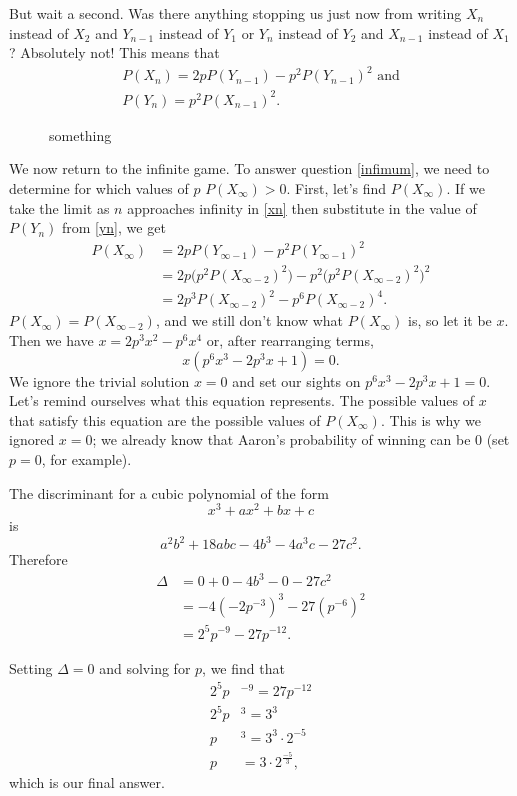 \documentclass{book}
\begin{document}
But wait a second. Was there anything stopping us just now from writing $X_n$ instead of $X_2$ and $Y_{n-1}$ instead of $Y_1$ or $Y_n$ instead of $Y_2$ and $X_{n-1}$ instead of $X_1$? Absolutely not! This means that
\begin{gather}
P(X_n) = 2pP(Y_{n-1}) - p^2P(Y_{n-1})^2\text{ and}\label{xn}\\
P(Y_n) = p^2P(X_{n-1})^2.\label{yn}
\end{gather}

\begin{figure}[ht]
\centering
{}
\caption{something}
\end{figure}



We now return to the infinite game. To answer question \ref{infimum}, we need to determine for which values of $p$ $P(X_\infty) > 0$. First, let's find $P(X_\infty)$. If we take the limit as $n$ approaches infinity in \eqref{xn} then substitute in the value of $P(Y_n)$ from \eqref{yn}, we get
\begin{align*}
P(X_\infty) &= 2pP(Y_{\infty-1}) - p^2P(Y_{\infty-1})^2\\
&= 2p\Big(p^2P(X_{\infty-2})^2\Big) - p^2\Big(p^2P(X_{\infty-2})^2\Big)^2\\
&= 2p^3P(X_{\infty-2})^2 - p^6P(X_{\infty-2})^4.
\end{align*}
$P(X_\infty) = P(X_{\infty-2})$, and we still don't know what $P(X_\infty)$ is, so let it be $x$. Then we have $x = 2p^3x^2 - p^6x^4$ or, after rearranging terms,
\begin{equation*}
x(p^6x^3 - 2p^3x + 1) = 0.
\end{equation*}
We ignore the trivial solution $x = 0$ and set our sights on $p^6x^3 - 2p^3x + 1 = 0$. Let's remind ourselves what this equation represents. The possible values of $x$ that satisfy this equation are the possible values of $P(X_\infty)$. This is why we ignored $x=0$; we already know that Aaron's probability of winning can be $0$ (set $p = 0$, for example). 

The discriminant for a cubic polynomial of the form \[x^3 + ax^2 + bx + c\] is \[a^2b^2 + 18abc - 4b^3 - 4a^3c - 27c^2.\] Therefore
\begin{align*}
\Delta &= 0 + 0 -4b^3 - 0 - 27c^2\\
&=-4(-2p^{-3})^3 - 27(p^{-6})^2\\
&=2^5p^{-9} - 27p^{-12}.
\end{align*}

Setting $\Delta = 0$ and solving for $p$, we find that
\begin{align*}
2^5p&^{-9} = 27p^{-12}\\
2^5p&^3 = 3^3\\
p&^3 = 3^3\cdot 2^{-5}\\
p& = 3\cdot 2^{\frac{-5}{3}},
\end{align*}
which is our final answer.
\end{document}
